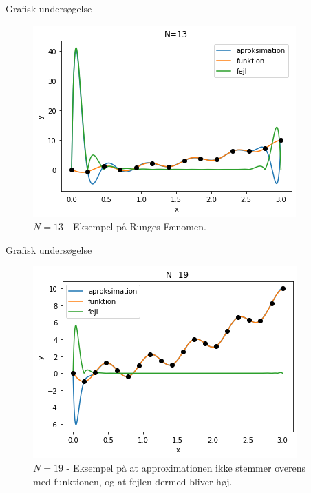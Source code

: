 
\begin{frame}{Grafisk undersøgelse}
    \begin{figure}[h!]
    \begin{center}
    \includegraphics[scale=0.5]{images/N=13.png}
    \end{center}
    \caption{$N = 13$ - Eksempel på Runges Fænomen.}
    \end{figure} 
\end{frame}

\begin{frame}{Grafisk undersøgelse}
    \begin{figure}[h!]
    \begin{center}
    \includegraphics[scale=0.5]{images/N=19.png}
    \end{center}
    \caption{$N = 19$ - Eksempel på at approximationen ikke stemmer overens med funktionen, og at fejlen dermed bliver høj.}
    \end{figure} 
    
\end{frame}

